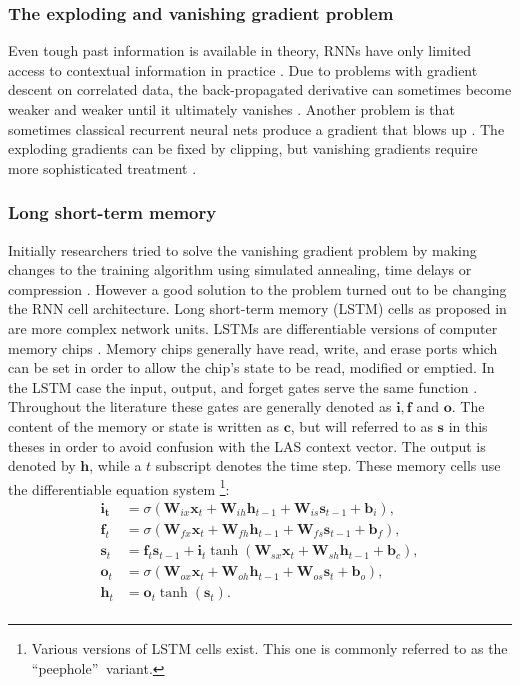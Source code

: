 \subsubsection{The exploding and vanishing gradient problem}
Even tough past information is available in theory, RNNs have only limited access to contextual information in practice \cite[page 1]{Graves2008}. Due to problems with gradient descent on correlated data, the back-propagated derivative can sometimes become weaker and weaker until it ultimately vanishes \cite{Hochreiter1998}. Another problem is that sometimes classical recurrent neural nets produce a gradient that blows up \cite{Pascanu2012}. The exploding gradients can be fixed by clipping, but vanishing gradients require more sophisticated treatment \cite{Bengio1993}.

\subsubsection{Long short-term memory}
Initially researchers tried to solve the vanishing gradient problem by making changes to the training algorithm using simulated annealing, time delays or compression \cite[page 32]{Graves2008}. However a good solution to the problem turned out to be changing the RNN cell architecture. Long short-term memory (LSTM) cells as proposed in \cite{Hochreiter1995} are more complex network units. LSTMs are differentiable versions of computer memory chips \cite[page 37]{Graves2012}. Memory chips generally have read, write, and erase ports which can be set in order to allow the chip's state to be read, modified or emptied. In the LSTM case the input, output, and forget gates serve the same function \cite[page 33]{Graves2008}. Throughout the literature these gates are generally denoted as $\mathbf{i}, \mathbf{f}$ and $\mathbf{o}$. The content of the memory or state is written as $\mathbf{c}$, but will referred to as $\mathbf{s}$ in this theses in order to avoid confusion with the LAS context vector. The output is denoted by $\mathbf{h}$, while a $t$ subscript denotes the time step.
These memory cells use the differentiable equation system \cite[page 5]{Graves2013}\footnote{ Various versions of LSTM cells exist. This one is commonly referred to as the \textquotedblleft peephole\textquotedblright $ \: $ variant. }:
\begin{align}
\mathbf{i_t} &= \sigma (\mathbf{W}_{ix} \mathbf{x}_t + \mathbf{W}_{ih} \mathbf{h}_{t-1} + \mathbf{W}_{is} \mathbf{s}_{t-1} +\mathbf{b}_i), \\
\mathbf{f}_t &= \sigma (\mathbf{W}_{fx} \mathbf{x}_t + \mathbf{W}_{fh} \mathbf{h}_{t-1} + \mathbf{W}_{fs} \mathbf{s}_{t-1} +\mathbf{b}_f), \\
\mathbf{s}_t &= \mathbf{f}_t \mathbf{s}_{t-1} + \mathbf{i}_t \tanh( \mathbf{W}_{sx} \mathbf{x}_t + \mathbf{W}_{sh} \mathbf{h}_{t-1} + \mathbf{b}_c ), \\
\mathbf{o}_t &= \sigma (\mathbf{W}_{ox} \mathbf{x}_t + \mathbf{W}_{oh} \mathbf{h}_{t-1} + \mathbf{W}_{os} \mathbf{s}_t + \mathbf{b}_o ), \\
\mathbf{h}_t &= \mathbf{o}_t \tanh(\mathbf{s}_t). \\
\end{align}
